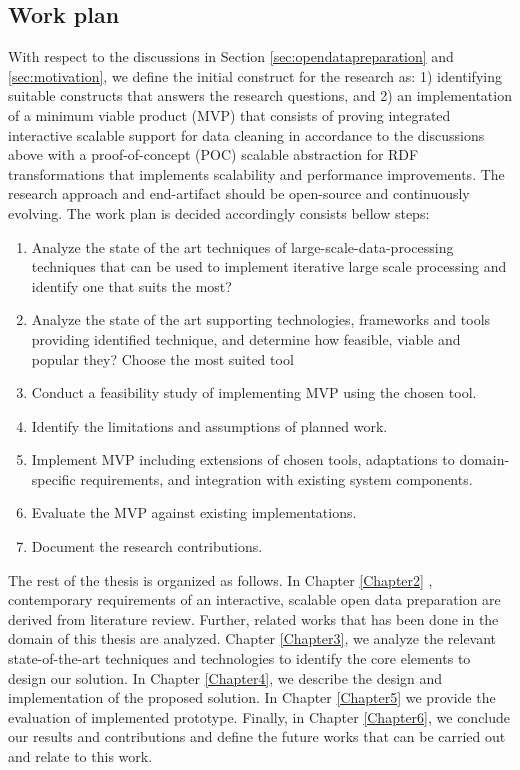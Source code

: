 \subsection{Work plan}
\noindent With respect to the discussions in Section \ref{sec:opendatapreparation}  and \ref{sec:motivation}, we define the initial construct for the research as: 1) identifying suitable constructs that answers the research questions, and  2) an implementation of a minimum viable product (MVP) that consists of proving integrated interactive scalable support for data cleaning in accordance to the discussions above with a proof-of-concept (POC) scalable abstraction for RDF transformations that implements scalability and performance improvements. The research approach and end-artifact should be open-source and continuously evolving.  The work plan is decided accordingly consists bellow steps:
\begin{enumerate}
\item Analyze the state of the art techniques of large-scale-data-processing techniques that can be used to implement iterative large scale processing and identify one that suits the most?
\item Analyze the state of the art supporting technologies, frameworks and tools providing identified technique, and determine how feasible, viable and popular they? Choose the most suited tool
\item Conduct a feasibility study of implementing MVP using the chosen tool.
\item Identify the limitations and assumptions of planned work. 
\item Implement MVP including extensions of chosen tools, adaptations to domain-specific requirements, and integration with existing system components.
\item Evaluate the MVP against existing implementations.
\item Document the research contributions. 
\end{enumerate}

The rest of the thesis is organized as follows. In Chapter \ref{Chapter2} , contemporary requirements of an interactive, scalable open data preparation are derived from literature review. Further, related works that has been done in the domain of this thesis are analyzed. Chapter \ref{Chapter3}, we analyze the relevant state-of-the-art techniques and technologies to identify the core elements to design our solution. In Chapter \ref{Chapter4}, we describe the design and implementation of the proposed solution. In Chapter \ref{Chapter5}  we provide the evaluation of implemented prototype. Finally, in Chapter \ref{Chapter6}, we conclude our results and contributions and define the future works that can be carried out and relate to this work. 

